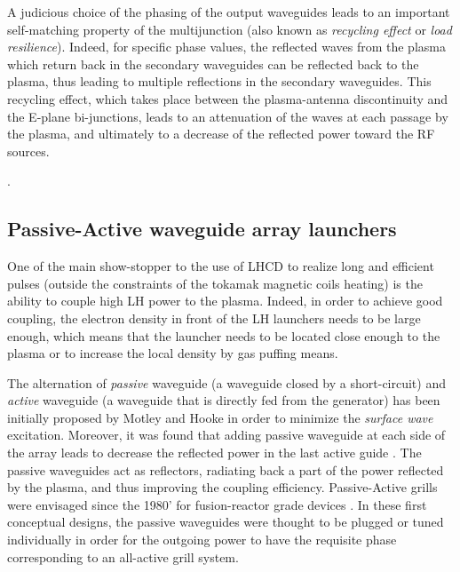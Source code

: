 A judicious choice of the phasing of the output waveguides leads to an important self-matching property of the multijunction (also known as \emph{recycling effect} or \emph{load resilience}). Indeed, for specific phase values, the reflected waves from the plasma which return back in the secondary waveguides can be reflected back to the plasma, thus leading to multiple reflections in the secondary waveguides. This recycling effect, which takes place between the plasma-antenna discontinuity and the E-plane bi-junctions, leads to an attenuation of the waves at each passage by the plasma, and ultimately to a decrease of the reflected power toward the RF sources. 

.



\subsection{Passive-Active waveguide array launchers}
One of the main show-stopper to the use of LHCD to realize long and efficient pulses (outside the constraints of the tokamak magnetic coils heating) is the ability to couple high LH power to the plasma. Indeed, in order to achieve good coupling, the electron density in front of the LH launchers needs to be large enough, which means that the launcher needs to be located close enough to the plasma or to increase the local density by gas puffing means. 

The alternation of \emph{passive} waveguide (a waveguide closed by a short-circuit) and \emph{active} waveguide (a waveguide that is directly fed from the generator) has been initially proposed by Motley and Hooke  in order to minimize the \emph{surface wave} excitation. Moreover, it was found that adding passive waveguide at each side of the array leads to decrease the reflected power in the last active guide . The passive waveguides act as reflectors, radiating back a part of the power reflected by the plasma, and thus improving the coupling efficiency. Passive-Active grills were envisaged since the 1980' for fusion-reactor grade devices . In these first conceptual designs, the passive waveguides were thought to be plugged or tuned individually in order for the outgoing power to have the requisite phase corresponding to an all-active grill system. 

